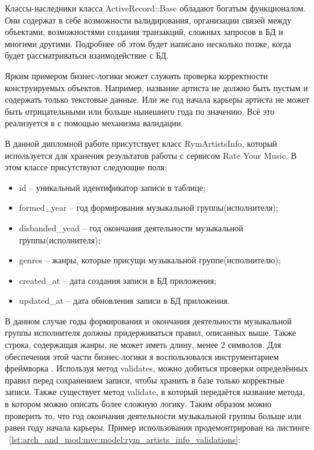 Классы-наследники класса ActiveRecord::Base обладают богатым функционалом. Они содержат в себе возможности валидирования, организации связей между объектами, возможностями создания транзакций, сложных запросов в БД и многими другими. Подробнее об этом будет написано несколько позже, когда будет рассматриваться взаимодействие с БД.

Ярким примером бизнес-логики может служить проверка корректности конструируемых объектов. Например, название артиста не должно быть пустым и содержать только текстовые данные. Или же год начала карьеры артиста не может быть отрицательными или больше нынешнего года по значению. Всё это реализуется в \ror{} с помощью механизма валидации.

В данной дипломной работе присутствует класс RymArtistsInfo, который используется для хранения результатов работы с сервисом Rate Your Music. В этом классе присутствуют следующие поля:

\begin{itemize}
  \item id -- уникальный идентификатор записи в таблице;
  \item formed\_year -- год формирования музыкальной группы(исполнителя);
  \item disbanded\_yead -- год окончания деятельности музыкальной группы(исполнителя);
  \item genres -- жанры, которые присущи музыкальной группе(исполнителю);
  \item created\_at -- дата создания записи в БД приложения;
  \item updated\_at -- дата обновления записи в БД приложения.
\end{itemize}

В данном случае годы формирования и окончания деятельности музыкальной группы исполнителя должны придерживаться правил, описанных выше. Также строка, содержащая жанры, не может иметь длину, менее 2 символов. Для обеспечения этой части бизнес-логики я воспользовался инструментарием фреймворка \ror{}. Используя метод validates, можно добиться проверки определённых правил перед сохранением записи, чтобы хранить в базе только корректные записи. Также существует метод validate, в который передаётся название метода, в котором можно описать более сложную логику. Таким образом можно проверить то, что год окончания деятельности музыкальной группы больше или равен году начала карьеры. Пример использования продемонтрирован на листинге ~\ref{lst:arch_and_mod:mvc:model:rym_artists_info_validations}:

